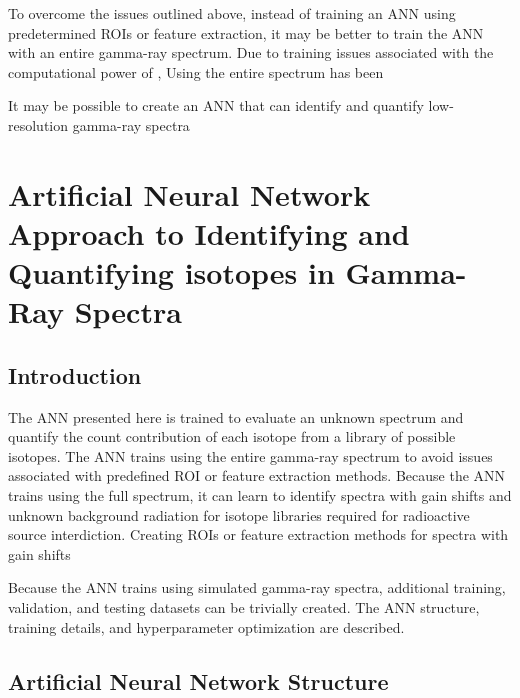 \documentclass[tocnosub,noragright,centerchapter,12pt,fullpage]{uiucecethesis09}
\begin{document}
To overcome the issues outlined above, instead of training an ANN using predetermined ROIs or feature extraction, it may be better to train the ANN with an entire gamma-ray spectrum. Due to training issues associated with the computational power of , Using the entire spectrum has been 



It may be possible to create an ANN that can identify and quantify low-resolution gamma-ray spectra





\chapter{Artificial Neural Network Approach to Identifying and Quantifying isotopes in Gamma-Ray Spectra}


\section{Introduction}

The ANN presented here is trained to evaluate an unknown spectrum and quantify the count contribution of each isotope from a library of possible isotopes. The ANN trains using the entire gamma-ray spectrum to avoid issues associated with predefined ROI or feature extraction methods. Because the ANN trains using the full spectrum, it can learn to identify spectra with gain shifts and unknown background radiation for isotope libraries required for radioactive source interdiction. Creating ROIs or feature extraction methods for spectra with gain shifts 

Because the ANN trains using simulated gamma-ray spectra, additional training, validation, and testing datasets can be trivially created. The ANN structure, training details, and hyperparameter optimization are described. 


\section{Artificial Neural Network Structure}
\end{document}
